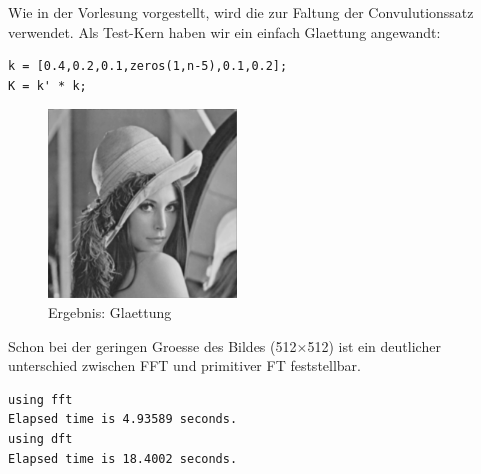 Wie in der Vorlesung vorgestellt, wird die zur Faltung der Convulutionssatz verwendet.
Als Test-Kern haben wir ein einfach Glaettung angewandt:
\lstset{language=matlab}
\begin{lstlisting}[]
k = [0.4,0.2,0.1,zeros(1,n-5),0.1,0.2];
K = k' * k;
\end{lstlisting}

\begin{figure}[H]
\begin{center}
\includegraphics[width=50mm]{u02/c_out.eps}
\end{center}
\caption{Ergebnis: Glaettung}
\end{figure}

Schon bei der geringen Groesse des Bildes (512$\times$512) ist ein deutlicher
unterschied zwischen FFT und primitiver FT feststellbar.
\begin{verbatim}
using fft
Elapsed time is 4.93589 seconds.
using dft
Elapsed time is 18.4002 seconds.
\end{verbatim}


